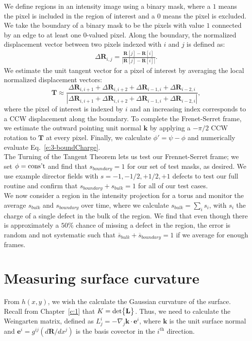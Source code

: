 We define regions in an intensity image using a binary mask, where a $1$ means the pixel is included in the region of interest and a $0$ means the pixel is excluded.
We take the boundary of a binary mask to be the pixels with value $1$ connected by an edge to at least one $0$-valued pixel.
Along the boundary, the normalized displacement vector between two pixels indexed with $i$ and $j$ is defined as:
\begin{align}
  \Delta \mathbf{R}_{i,j} =  \frac{\mathbf{R}[j]-\mathbf{R}[i]}{|\mathbf{R}[j]-\mathbf{R}[i]|}.
\end{align}
We estimate the unit tangent vector for a pixel of interest by averaging the local normalized displacement vectors:
\begin{equation}
  \mathbf{T} \approx \frac{\Delta \mathbf{R}_{i,i+1} + \Delta \mathbf{R}_{i,i+2} + \Delta \mathbf{R}_{i-1,i} + \Delta \mathbf{R}_{i-2,i}}{|\Delta \mathbf{R}_{i,i+1} + \Delta \mathbf{R}_{i,i+2} + \Delta \mathbf{R}_{i-1,i} + \Delta \mathbf{R}_{i-2,i}|},
\end{equation}
where the pixel of interest is indexed by $i$ and an increasing index corresponds to a CCW displacement along the boundary.
To complete the Frenet-Serret frame, we estimate the outward pointing unit normal $\mathbf{k}$ by applying a $-\pi/2$ CCW rotation to $\mathbf{T}$ at every pixel.
Finally, we calculate $\phi' = \psi-\phi$ and numerically evaluate Eq.~\ref{e:3-boundCharge}.\\

The Turning of the Tangent Theorem lets us test our Frennet-Serret frame; we set $\phi = \textup{cons't}$ and find that $s_{boundary} = 1$ for our set of test masks, as desired.
We use example director fields with $s = -1, -1/2, +1/2, +1$ defects to test our full routine and confirm that $s_{boundary} + s_{bulk} = 1$ for all of our test cases.\\


We now consider a region in the intensity projection for a torus and monitor the average $s_{bulk}$ and $s_{boundary}$ over time, where we calculate $s_{bulk} = \sum_i s_i$, with $s_i$ the charge of a single defect in the bulk of the region.
We find that even though there is approximately a $50\%$ chance of missing a defect in the region, the error is random and not systematic such that $\overline{s}_{bulk} + \overline{s}_{boundary} = 1$ if we average for enough frames.





\section{Measuring surface curvature}
From $h(x,y)$, we wish the calculate the Gaussian curvature of the surface.
Recall from Chapter~\ref{c:1} that $K = \textup{det} \big \{ \mathbf{L} \big \}$.
Thus, we need to calculate the Weingarten matrix, defined as $L^i_j = -\nabla_j \mathbf{k} \cdot \mathbf{e}^i$, where $\mathbf{k}$ is the unit surface normal and $\mathbf{e}^i = g^{ij}(d \mathbf{R}/dx^j)$ is the basis covector in the $i^{\textrm{th}}$ direction.


